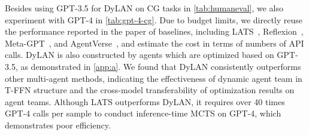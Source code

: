 \documentclass{article} %
\begin{document}
\begin{table}
\vspace{-1em}
\centering
{}
    \caption{Experimental results on the CG task on \texttt{GPT-4-0613}. The number in parentheses indicates the difference relative to the single execution or direct execution. The bold font denotes the results of our method and the best results are underlined.}\label{tab:gpt-4-cg}
\end{table}

Besides using GPT-3.5 for DyLAN on CG tasks in \cref{tab:humaneval}, we also experiment with GPT-4 in \cref{tab:gpt-4-cg}. Due to budget limits, we directly reuse the performance reported in the paper of baselines, including LATS~\citep{lats}, Reflexion~\citep{reflexion}, Meta-GPT~\citep{meta-gpt}, and AgentVerse~\citep{chen2023agentverse}, and estimate the cost in terms of numbers of API calls. DyLAN is also constructed by agents which are optimized based on GPT-3.5, as demonstrated in \cref{app:a}. We found that DyLAN consistently outperforms other multi-agent methods, indicating the effectiveness of dynamic agent team in T-FFN structure and the cross-model transferability of optimization results on agent teams. Although LATS outperforms DyLAN, it requires over 40 times GPT-4 calls per sample to conduct inference-time MCTS on GPT-4, which demonstrates poor efficiency. 
\end{document}
